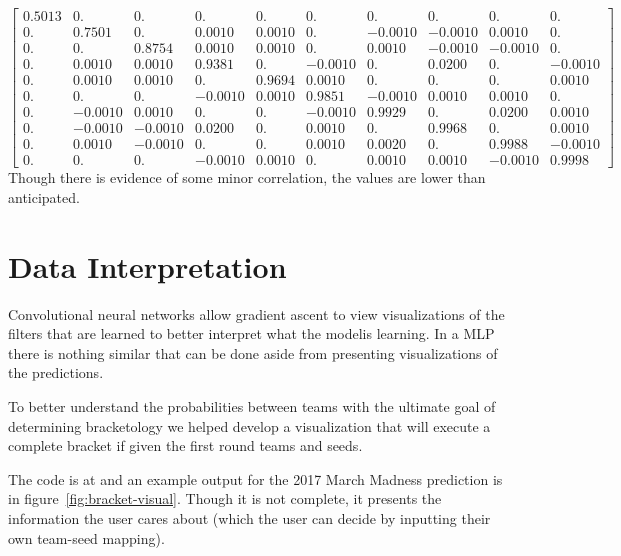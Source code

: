\documentclass{article} %
\begin{document}
\[
\begin{bmatrix}
  0.5013 &  0.     &  0.     &  0.     &  0.     &  0.     &  0.     &  0.     &  0.     &  0.    \\
  0.     &  0.7501 &  0.     &  0.0010 &  0.0010 &  0.     & -0.0010 & -0.0010 &  0.0010 &  0.    \\
  0.     &  0.     &  0.8754 &  0.0010 &  0.0010 &  0.     &  0.0010 & -0.0010 & -0.0010 &  0.    \\
  0.     &  0.0010 &  0.0010 &  0.9381 &  0.     & -0.0010 &  0.     &  0.0200 &  0.     & -0.0010\\
  0.     &  0.0010 &  0.0010 &  0.     &  0.9694 &  0.0010 &  0.     &  0.     &  0.     &  0.0010\\
  0.     &  0.     &  0.     & -0.0010 &  0.0010 &  0.9851 & -0.0010 &  0.0010 &  0.0010 &  0.    \\
  0.     & -0.0010 &  0.0010 &  0.     &  0.     & -0.0010 &  0.9929 &  0.     &  0.0200 &  0.0010\\
  0.     & -0.0010 & -0.0010 &  0.0200 &  0.     &  0.0010 &  0.     &  0.9968 &  0.     &  0.0010\\
  0.     &  0.0010 & -0.0010 &  0.     &  0.     &  0.0010 &  0.0020 &  0.     &  0.9988 & -0.0010\\
  0.     &  0.     &  0.     & -0.0010 &  0.0010 &  0.     &  0.0010 &  0.0010 & -0.0010 &  0.9998
\end{bmatrix}
\]
Though there is evidence of some minor correlation, the values are lower than anticipated.


\section{Data Interpretation}
\label{sec:data-interpretation}

Convolutional neural networks allow gradient ascent to view visualizations of the filters that are learned to better interpret what the modelis learning.
In a MLP there is nothing similar that can be done aside from presenting visualizations of the predictions.

To better understand the probabilities between teams with the ultimate goal of determining bracketology we helped develop a visualization that will execute a complete bracket if given the first round teams and seeds.

The code is at \citep{bracket-visual} and an example output for the 2017 March Madness prediction is in figure~\ref{fig:bracket-visual}.
Though it is not complete, it presents the information the user cares about (which the user can decide by inputting their own team-seed mapping).
\end{document}
